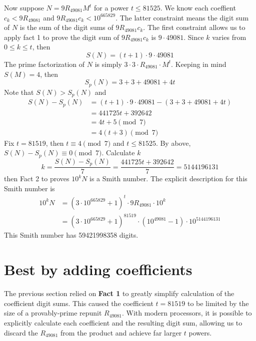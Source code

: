\documentclass{amsart}
\newcommand{\RE}{{49081}}
\newcommand{\ME}{{665829}}
\numberwithin{equation}{section}
\theoremstyle{plain} %
\theoremstyle{definition}
\theoremstyle{remark}
\begin{document}
Now suppose $N = 9 R_{49081} M^t$ for a power $t\leq 81525$. We know each coeffient $c_k < 9R_{\RE}$ and $9 R_{\RE} c_k < 10^\ME$. The latter constraint means the digit sum of $N$ is the sum of the digit sums of $9 R_{49081} c_k$. The first constraint allows us to apply fact 1 to prove the digit sum of $ 9 R_{49081} c_k$ is $9 \cdot 49081$. Since $k$ varies from $0 \leq k \leq t$, then
$$S(N) = (t+1) \cdot 9 \cdot 49081$$
The prime factorization of $N$ is simply $3\cdot 3 \cdot R_\RE \cdot M^t$. Keeping in mind $S(M) = 4$, then
$$S_p(N) = 3 + 3 + \RE + 4t$$
Note that $S(N) > S_p(N)$ and 
\begin{align*}
S(N) - S_p(N) &= (t+1) \cdot 9 \cdot \RE - (3 + 3 + \RE + 4t) \\
&= 441725 t + 392642 \\
&= 4t +5 \pmod{7}\\
&= 4(t +3) \pmod{7}
\end{align*}
Fix $t=81519$, then $t \equiv 4 \pmod{7}$ and $t \leq 81525$. By above, $S(N) - S_p(N) \equiv 0 \pmod{7}$. Calculate $k$
$$k = \frac{ S(N) - S_p(N)}{7} = \frac{441725 t + 392642}{7} = 5144196131$$
then Fact 2 to proves $10^k N$ is a Smith number. The explicit description for this Smith number is
\begin{align*}
10^k N &= (3\cdot 10^\ME + 1)^t \cdot 9R_\RE \cdot 10^k \\
&=  (3\cdot 10^\ME + 1)^{81519} \cdot (10 ^{49081} -1 ) \cdot 10^{ 5144196131}
\end{align*}
This Smith number has \num{59421998358} digits.
\\ 
 \section{Best by adding coefficients}
The previous section relied on {\bf Fact 1} to greatly simplify calculation of the coefficient digit sums. This caused the coefficient $t=81519$ to be limited by the size of a provably-prime repunit $R_\RE$. With modern processors, it is possible to explicitly calculate each coefficient and the resulting digit sum, allowing us to discard the $R_\RE$ from the product and achieve far larger $t$ powers. 
\end{document}
